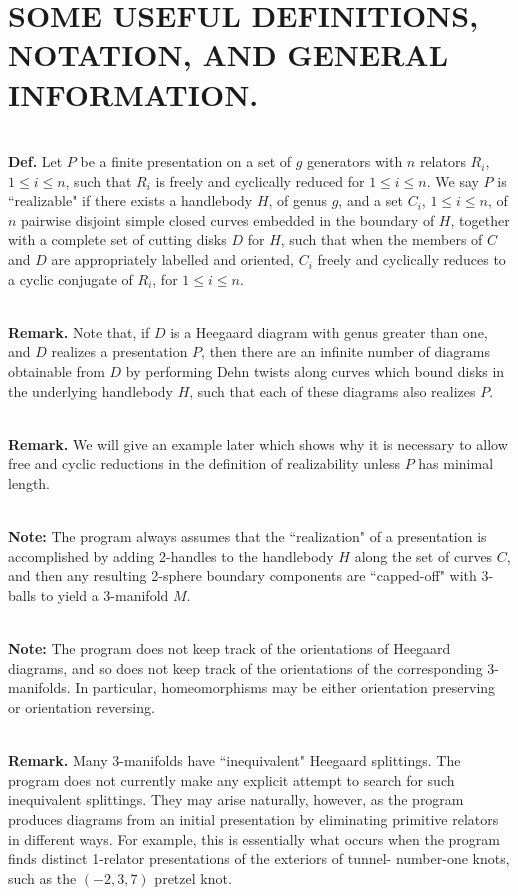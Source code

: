 \documentclass[12pt]{amsart}
\newcommand{\definition}{\ \\ \noindent \textbf{Def.} }
\newcommand{\note}{\ \\ \noindent  \textbf{Note:} }
\newcommand{\remark}{\ \\ \noindent \textbf{Remark.} }
\begin{document}
\section{SOME USEFUL DEFINITIONS, NOTATION, AND GENERAL INFORMATION.}
                                                
                                                                                
\definition     Let $P$ be a finite presentation on a set of $g$ generators with $n$ relators $R_i$,
        $1 \leq i \leq n$, such that $R_i$ is freely and cyclically reduced for $1 \leq i \leq n$. We say $P$ is
        ``realizable" if there exists a handlebody $H$, of genus $g$, and a set $C_i$, $1 \leq i \leq n$, of
        $n$ pairwise disjoint simple closed curves embedded in the boundary of $H$, together with a
        complete set of cutting disks $D$ for $H$, such that when the members of $C$ and $D$ are
        appropriately labelled and oriented, $C_i$ freely and cyclically reduces to a cyclic
        conjugate of $R_i$, for $1 \leq i \leq n$.

\remark Note that, if $D$ is a Heegaard diagram with genus greater than one, and $D$ 
        realizes a presentation $P$, then there are an infinite number of diagrams obtainable
        from $D$ by performing Dehn twists along curves which bound disks in the underlying
        handlebody $H$, such that each of these diagrams also realizes $P$.

\remark We will give an example later which shows why it is necessary to allow free and
        cyclic reductions in the definition of realizability unless $P$ has minimal length.

\note   The program always assumes that the ``realization" of a presentation is accomplished
        by adding 2-handles to the handlebody $H$ along the set of curves $C$, and then any
        resulting 2-sphere boundary components are ``capped-off" with 3-balls to yield a
        3-manifold $M$.
        
\note   The program does not keep track of the orientations of Heegaard diagrams, and so
        does not keep track of the orientations of the corresponding 3-manifolds. In particular,
        homeomorphisms may be either orientation preserving or orientation reversing.   

\remark Many 3-manifolds have ``inequivalent" Heegaard splittings. The program does not
        currently make any explicit attempt to search for such inequivalent splittings. They may
        arise naturally, however, as the program produces diagrams from an initial presentation
        by eliminating primitive relators in different ways. For example, this is essentially what
        occurs when the program finds distinct 1-relator presentations of the exteriors of tunnel-
        number-one knots, such as the $(-2,3,7)$ pretzel knot.
        
\end{document}
